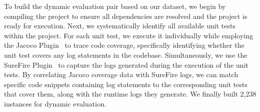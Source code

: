 To build the dynamic evaluation pair based on our dataset, we begin by compiling the project to ensure all dependencies are resolved and the project is ready for execution. Next, we systematically identify all available unit tests within the project. For each unit test, we execute it individually while employing the Jacoco Plugin~\cite{Jacoco} to trace code coverage, specifically identifying whether the unit test covers any log statements in the codebase. Simultaneously, we use the SureFire Plugin~\cite{surefire} to capture the logs generated during the execution of the unit tests.
By correlating Jacoco coverage data with SureFire logs, we can match specific code snippets containing log statements to the corresponding unit tests that cover them, along with the runtime logs they generate.
We finally built 2,238 instances for dynamic evaluation.





